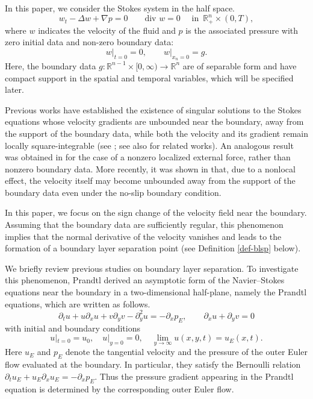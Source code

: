 \documentclass{amsart}
\numberwithin{equation}{section}
\newcommand{\na}{\nabla}
\newcommand{\De}{\Delta}
\begin{document}
In this paper, we consider the Stokes system in the half space.
\begin{equation}\label{Stokes-10}
w_t - \De w+  \na p =0\qquad \mbox{div } w =0 \quad \mbox{ in }
\, {\mathbb R}^n_+ \times (0, T),
\end{equation}
where  $ w$  indicates the velocity of the fluid and $p$ is the associated pressure  
with zero initial data and non-zero boundary data:
\begin{equation}\label{Stokes-icbc}
\left. w \right|_{t=0}=0,
\qquad
\left. w \right|_{x_n=0}=g.
\tag{1.2}
\end{equation}
Here,  the boundary data $g:\mathbb{R}^{n-1}\times [0, \infty) \to \mathbb{R}^n$
are of separable form and have  compact support in the spatial and temporal variables, which will be specified later.

Previous works have established the existence of singular solutions to the Stokes equations whose velocity gradients are unbounded near the boundary, away from the support of the boundary data, while both the velocity and its gradient remain locally square-integrable (see \cite{Kang05,CK20,KangTsai22FE,CK24,KM}; see also \cite{CH2,CCK2,KangTsai22} for related works).
An analogous result was obtained in \cite{CK25} for the case of a nonzero localized external force, rather than nonzero boundary data. More recently, it was shown in \cite{CK26} that, due to a nonlocal effect, the velocity itself may become unbounded away from the support of the boundary data even under the no-slip boundary condition.

In this paper, we focus on the sign change of the velocity field near the boundary. Assuming that the boundary data are sufficiently regular, this phenomenon implies that the normal derivative of the velocity vanishes and leads to the formation of a boundary layer separation point (see Definition \ref{def-blsp} below).

We briefly review previous studies on boundary layer separation. To investigate this phenomenon, Prandtl \cite{P} derived an asymptotic form of the Navier–Stokes equations near the boundary in a two-dimensional half-plane, namely the Prandtl equations, which are written as follows.
\[
\partial_t u+u\partial_x u+v\partial_y v-\partial_y^2 u=-\partial_x p_E,\qquad \partial_x u+\partial_y v=0
\]
with initial and boundary conditions
\[
u|_{t=0}=u_0,\quad u|_{y=0}=0,\quad \displaystyle\lim_{y\rightarrow \infty}u(x,y,t)=u_E(x,t).
\]
Here \(u_E\) and \(p_E\) denote the tangential velocity and the pressure
of the outer Euler flow evaluated at the boundary. In particular, they satisfy
the Bernoulli relation
$\partial_t u_E + u_E \partial_x u_E = -\partial_x p_E $.
Thus the pressure gradient appearing in the Prandtl equation is determined
by the corresponding outer Euler flow.
\end{document}
